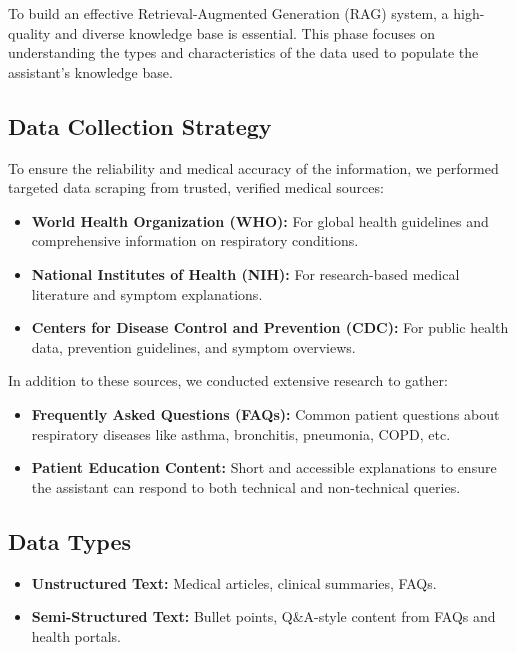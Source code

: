 \label{sec:data-understanding}

To build an effective Retrieval-Augmented Generation (RAG) system, a high-quality and diverse knowledge base is essential. This phase focuses on understanding the types and characteristics of the data used to populate the assistant's knowledge base.

\subsection*{Data Collection Strategy}
To ensure the reliability and medical accuracy of the information, we performed targeted data scraping from trusted, verified medical sources:

\begin{itemize}
    \item \textbf{World Health Organization (WHO):} For global health guidelines and comprehensive information on respiratory conditions.
    
    \item \textbf{National Institutes of Health (NIH):} For research-based medical literature and symptom explanations.
    
    \item \textbf{Centers for Disease Control and Prevention (CDC):} For public health data, prevention guidelines, and symptom overviews.
\end{itemize}

In addition to these sources, we conducted extensive research to gather:

\begin{itemize}
    \item \textbf{Frequently Asked Questions (FAQs):} Common patient questions about respiratory diseases like asthma, bronchitis, pneumonia, COPD, etc.
    
    \item \textbf{Patient Education Content:} Short and accessible explanations to ensure the assistant can respond to both technical and non-technical queries.
\end{itemize}

\subsection*{Data Types}
\begin{itemize}
    \item \textbf{Unstructured Text:} Medical articles, clinical summaries, FAQs.
    
    \item \textbf{Semi-Structured Text:} Bullet points, Q\&A-style content from FAQs and health portals.
\end{itemize}

